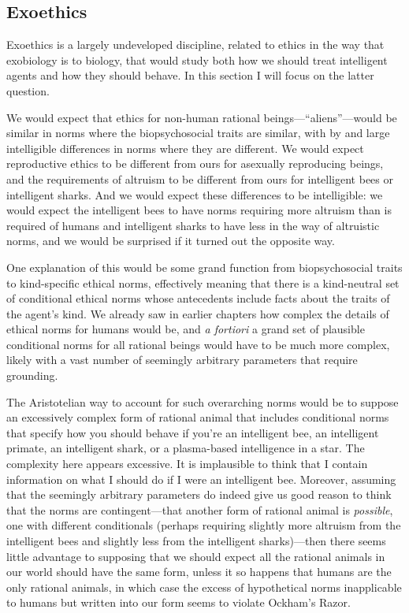 \subsection{Exoethics}
Exoethics is a largely undeveloped discipline, related to ethics in the way that exobiology is to biology, that 
would study both how we should treat intelligent agents and how they should behave. In this section I will focus on the 
latter question.

We would expect that ethics for non-human rational beings---``aliens''---would be similar in norms 
where the biopsychosocial traits are similar, with by and large intelligible differences in norms where they are 
different. We would expect reproductive ethics to be different from ours for asexually reproducing beings, and the 
requirements of altruism to be different from ours for intelligent bees or intelligent sharks. And we would expect 
these differences to be intelligible: we would expect the intelligent bees to have norms requiring more altruism than
is required of humans and intelligent sharks to have less in the way of altruistic norms, and we would be surprised if 
it turned out the opposite way.

One explanation of this would be some grand function from biopsychosocial traits to kind-specific ethical norms, 
effectively meaning that there is a kind-neutral set of conditional ethical norms whose antecedents include facts
about the traits of the agent's kind. We already saw in earlier chapters how complex the details of ethical 
norms for humans would be, and \textit{a fortiori} a grand set of plausible conditional norms for all rational beings 
would have to be much more complex, likely with a vast number of seemingly arbitrary parameters that require grounding.

The Aristotelian way to account for such overarching norms would be to suppose an excessively complex form of rational animal that 
includes conditional norms that specify how you should behave if you're an intelligent bee, an intelligent primate, 
an intelligent shark, or a plasma-based intelligence in a star. The complexity here appears excessive. It is 
implausible to think that I contain information on what I should do if I were an intelligent bee.
Moreover, assuming that the seemingly arbitrary parameters do indeed give us good reason to think that the norms 
are contingent---that another form of rational animal is \textit{possible}, one with different conditionals (perhaps requiring
slightly more altruism from the intelligent bees and slightly less from the intelligent sharks)---then there seems 
little advantage to supposing that we should expect all the rational animals in our world should have the same 
form, unless it so happens that humans are the only rational animals, in which case the excess of hypothetical norms 
inapplicable to humans but written into our form seems to violate Ockham's Razor.

